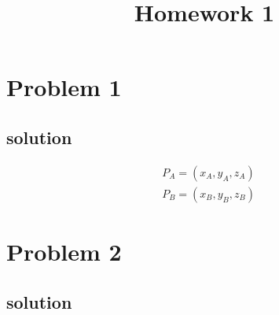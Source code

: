 \documentclass[12pt]{kjleehw}
\begin{document}
\title{\textbf{Homework 1}}


\section{Problem 1}
\subsection*{solution} %

\begin{align*}
& P_A = (x_A,y_A,z_A)\\
& P_B = (x_B,y_B,z_B)
\end{align*}

\newpage

\section{Problem 2}
\subsection*{solution}



\end{document}
